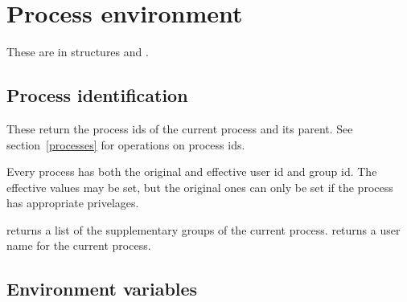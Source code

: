 \section{Process environment}

These are in structures  and .

\subsection{Process identification}

\begin{protos}
\end{protos}
\noindent
These return the process ids of the current process and its parent.
See section~\ref{processes} for operations on process ids.

\begin{protos}
\end{protos}

\begin{protos}
\end{protos}
\noindent
Every process has both the original and effective user id and group id.
The effective values may be set, but the original ones can only be set
if the process has appropriate privelages.

\begin{protos}
\end{protos}
\noindent
{} returns a list of the supplementary groups of the
 current process.
 returns a user name for the current process.



\subsection{Environment variables}

